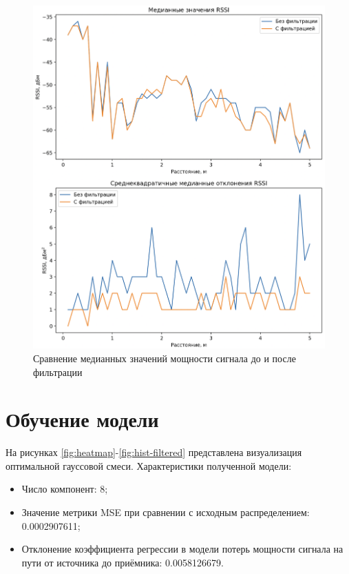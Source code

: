 \begin{figure}[H]
	\centering
	\includegraphics[width=\textwidth]{assets/medians.png}
	\caption{Сравнение медианных значений мощности сигнала до и после фильтрации}
	\label{fig:medians}
\end{figure}

\section{Обучение модели}

На рисунках \ref{fig:heatmap}-\ref{fig:hist-filtered} представлена визуализация оптимальной гауссовой смеси. Характеристики полученной модели:
\begin{itemize}[label*=---]
	\item Число компонент: 8;
	\item Значение метрики MSE при сравнении с исходным распределением: 0.0002907611;
	\item Отклонение коэффициента регрессии в модели потерь мощности сигнала на пути от источника до приёмника: 0.0058126679.
\end{itemize}

